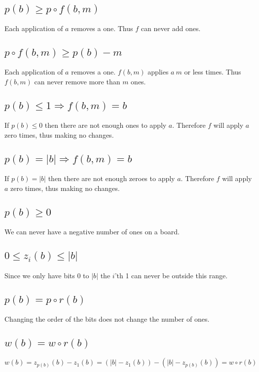 \documentclass{article}
\begin{document}
\subsection{$p(b)\ge p\circ f(b,m)$}
Each application of $a$ removes a one. Thus $f$ can never add ones. 

\subsection{$p\circ f(b,m)\ge p(b)-m$}
Each application of $a$ removes a one. $f(b,m)$ applies $a\ m$ or less times. Thus $f(b,m)$ can never remove more than $m$ ones. 

\subsection{$p(b) \le 1 \Rightarrow f(b,m) = b$}
If $p(b) \le 0$ then there are not enough ones to apply $a$. 
Therefore $f$ will apply $a$ zero times, thus making no changes.

\subsection{$p(b) = |b| \Rightarrow f(b,m) = b$}
If $p(b) = |b| $ then there are not enough zeroes to apply $a$. 
Therefore $f$ will apply $a$ zero times, thus making no changes.

\subsection{$p(b)\ge 0$}
We can never have a negative number of ones on a board.

\subsection{$0 \le z_i(b)\le |b|$}
Since we only have bits 0 to $|b|$ the $i$'th 1 can never be outside this range.

\subsection{$p(b) = p\circ r(b)$}\label{rev_count}
Changing the order of the bits does not change the number of ones.

\subsection{$w(b) = w\circ r(b)$}
$w(b) = z_{p(b)}(b)-z_1(b)= (|b|-z_{1}(b))-(|b|-z_{p(b)}(b))=w\circ r(b)$
\end{document}
